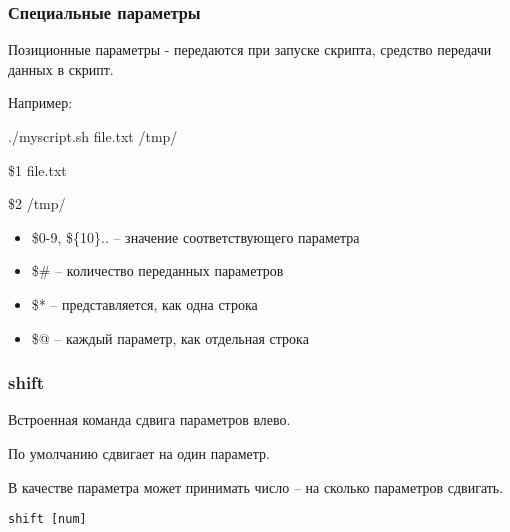\begin{frame}
	\frametitle{Специальные параметры}

	Позиционные параметры - передаются при запуске скрипта, средство передачи данных в скрипт.

        Например: 

        ./myscript.sh file.txt /tmp/

        \$1 file.txt

        \$2 /tmp/
        
	\begin{itemize}
		\item \alert{ \$0-9, \$\{10\}}..  -- значение соответствующего параметра
		\item \alert{\$\#} -- количество переданных параметров
		\item \alert{\$*} -- представляется, как одна строка
		\item \alert{\$@} -- каждый параметр, как отдельная строка
	\end{itemize}

\end{frame}


\begin{frame}[fragile]
	\frametitle{shift}

	Встроенная команда сдвига параметров влево.

        По умолчанию сдвигает на один параметр.

	В качестве параметра может принимать число -- на сколько параметров сдвигать.

\begin{lstlisting}
shift [num]
\end{lstlisting}

\end{frame}


%
%


